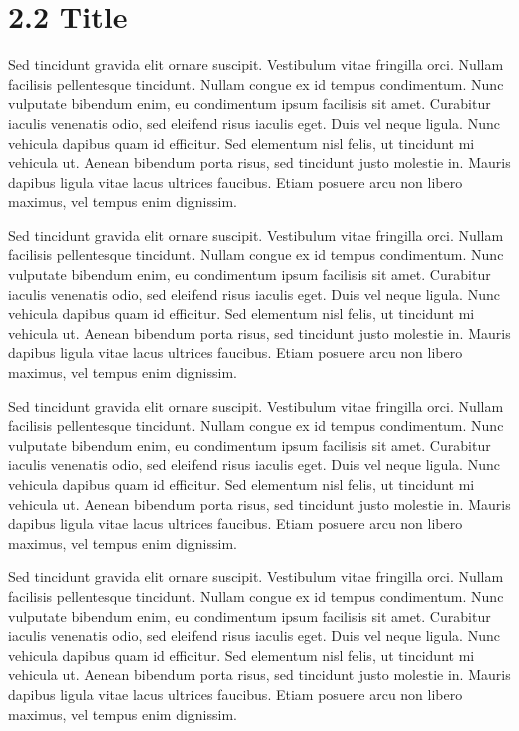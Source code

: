 \section{2.2 Title}
Sed tincidunt gravida elit ornare suscipit. Vestibulum vitae fringilla orci. Nullam facilisis pellentesque tincidunt. Nullam congue ex id tempus condimentum. Nunc vulputate bibendum enim, eu condimentum ipsum facilisis sit amet. Curabitur iaculis venenatis odio, sed eleifend risus iaculis eget. Duis vel neque ligula. Nunc vehicula dapibus quam id efficitur. Sed elementum nisl felis, ut tincidunt mi vehicula ut. Aenean bibendum porta risus, sed tincidunt justo molestie in. Mauris dapibus ligula vitae lacus ultrices faucibus. Etiam posuere arcu non libero maximus, vel tempus enim dignissim. \par
Sed tincidunt gravida elit ornare suscipit. Vestibulum vitae fringilla orci. Nullam facilisis pellentesque tincidunt. Nullam congue ex id tempus condimentum. Nunc vulputate bibendum enim, eu condimentum ipsum facilisis sit amet. Curabitur iaculis venenatis odio, sed eleifend risus iaculis eget. Duis vel neque ligula. Nunc vehicula dapibus quam id efficitur. Sed elementum nisl felis, ut tincidunt mi vehicula ut. Aenean bibendum porta risus, sed tincidunt justo molestie in. Mauris dapibus ligula vitae lacus ultrices faucibus. Etiam posuere arcu non libero maximus, vel tempus enim dignissim. \par
Sed tincidunt gravida elit ornare suscipit. Vestibulum vitae fringilla orci. Nullam facilisis pellentesque tincidunt. Nullam congue ex id tempus condimentum. Nunc vulputate bibendum enim, eu condimentum ipsum facilisis sit amet. Curabitur iaculis venenatis odio, sed eleifend risus iaculis eget. Duis vel neque ligula. Nunc vehicula dapibus quam id efficitur. Sed elementum nisl felis, ut tincidunt mi vehicula ut. Aenean bibendum porta risus, sed tincidunt justo molestie in. Mauris dapibus ligula vitae lacus ultrices faucibus. Etiam posuere arcu non libero maximus, vel tempus enim dignissim. \par
Sed tincidunt gravida elit ornare suscipit. Vestibulum vitae fringilla orci. Nullam facilisis pellentesque tincidunt. Nullam congue ex id tempus condimentum. Nunc vulputate bibendum enim, eu condimentum ipsum facilisis sit amet. Curabitur iaculis venenatis odio, sed eleifend risus iaculis eget. Duis vel neque ligula. Nunc vehicula dapibus quam id efficitur. Sed elementum nisl felis, ut tincidunt mi vehicula ut. Aenean bibendum porta risus, sed tincidunt justo molestie in. Mauris dapibus ligula vitae lacus ultrices faucibus. Etiam posuere arcu non libero maximus, vel tempus enim dignissim. \par
